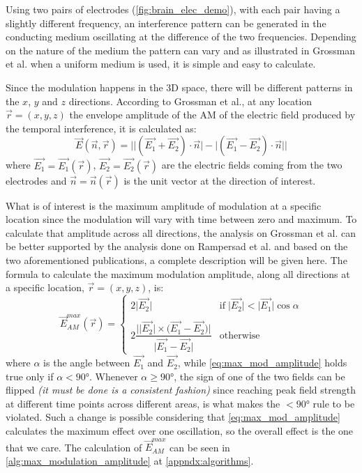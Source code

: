 Using two pairs of electrodes (\autoref{fig:brain_elec_demo}), with each pair having a slightly different frequency, an interference pattern can be generated in the conducting medium oscillating at the difference of the two frequencies. Depending on the nature of the medium the pattern can vary and as illustrated in Grossman et al.\cite{Grossman2017} when a uniform medium is used, it is simple and easy to calculate.

Since the modulation happens in the 3D space, there will be different patterns in the $x$, $y$ and $z$ directions. According to Grossman et al.\cite[page 20]{Grossman2017}, at any location $\vec{r} = (x,y,z)$ the envelope amplitude of the \gls{AM} of the electric field produced by the temporal interference, it is calculated as:
\begin{equation}
    \label{eq:directional_amplitude}
    \vec{E}(\vec{n},\vec{r}) = \Big|\big|(\vec{E_1} + \vec{E_2})\cdot\vec{n}\big| - \big|(\vec{E_1} - \vec{E_2})\cdot\vec{n}\big|\Big|
\end{equation}
where $\vec{E_1} = \vec{E_1}(\vec{r})$, $\vec{E_2} = \vec{E_2}(\vec{r})$ are the electric fields coming from the two electrodes and $\vec{n} = \vec{n}(\vec{r})$ is the unit vector at the direction of interest.
\\\vspace{1pt}

What is of interest is the maximum amplitude of modulation at a specific location since the modulation will vary with time between zero and maximum. To calculate that amplitude across all directions, the analysis on Grossman et al.\cite[page 20]{Grossman2017} can be better supported by the analysis done on Rampersad et al.\cite[section 2.5]{Rampersad2019} and based on the two aforementioned publications, a complete description will be given here. The formula to calculate the maximum modulation amplitude, along all directions at a specific location, $\vec{r} = (x,y,z)$, is:
\begin{equation}
    \label{eq:max_mod_amplitude}
    \vec{E}_{AM}^{max}(\vec{r}) = \begin{cases}
        2\big|\vec{E_2}\big| & \text{if}\; \big|\vec{E_2}\big| < \big|\vec{E_1}\big|\cos\alpha \\
        &\\
      2\dfrac{\Big|\big|\vec{E_2}\big|\times\big(\vec{E_1} - \vec{E_2}\big)\Big|}{\big|\vec{E_1} - \vec{E_2}\big|} & \text{otherwise}
    \end{cases}
\end{equation}
where $\alpha$ is the angle between $\vec{E_1}$ and $\vec{E_2}$, while \autoref{eq:max_mod_amplitude} holds true only if $\alpha < 90\si{\degree}$. Whenever $\alpha \geq 90\si{\degree}$, the sign of one of the two fields can be flipped \textit{(it must be done is a consistent fashion)} since reaching peak field strength at different time points across different areas, is what makes the $< 90\si{\degree}$ rule to be violated. Such a change is possible considering that \autoref{eq:max_mod_amplitude} calculates the maximum effect over one oscillation, so the overall effect is the one that we care. The calculation of $\vec{E}_{AM}^{max}$ can be seen in \autoref{alg:max_modulation_amplitude} at \autoref{appndx:algorithms}.

